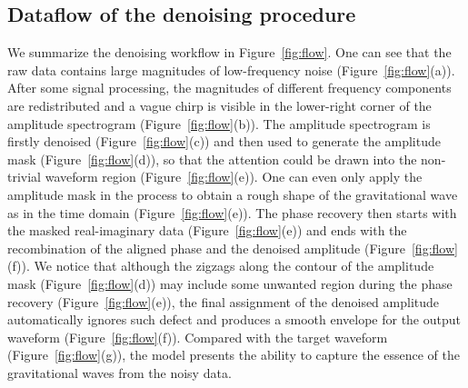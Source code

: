 \documentclass[preprint,12pt]{elsarticle}
\begin{document}
\subsection{Dataflow of the denoising procedure}\label{subsec:flow}
We summarize the denoising workflow in Figure~\ref{fig:flow}.
One can see that the raw data contains large magnitudes of low-frequency noise (Figure~\ref{fig:flow}(a)).
After some signal processing, the magnitudes of different frequency components are redistributed and a vague chirp is visible in the lower-right corner of the amplitude spectrogram (Figure~\ref{fig:flow}(b)). 
The amplitude spectrogram is firstly denoised (Figure~\ref{fig:flow}(c)) and then used to generate the amplitude mask (Figure~\ref{fig:flow}(d)), so that the attention could be drawn into the non-trivial waveform region (Figure~\ref{fig:flow}(e)).
One can even only apply the amplitude mask in the process to obtain a rough shape of the gravitational wave as in the time domain (Figure~\ref{fig:flow}(e)).
The phase recovery then starts with the masked real-imaginary data (Figure~\ref{fig:flow}(e)) and ends with the recombination of the aligned phase and the denoised amplitude (Figure~\ref{fig:flow}(f)).
We notice that although the zigzags along the contour of the amplitude mask (Figure~\ref{fig:flow}(d)) may include some unwanted region during the phase recovery (Figure~\ref{fig:flow}(e)), the final assignment of the denoised amplitude automatically ignores such defect and produces a smooth envelope for the output waveform (Figure~\ref{fig:flow}(f)).
Compared with the target waveform (Figure~\ref{fig:flow}(g)), the model presents the ability to capture the essence of the gravitational waves from the noisy data.
\end{document}
